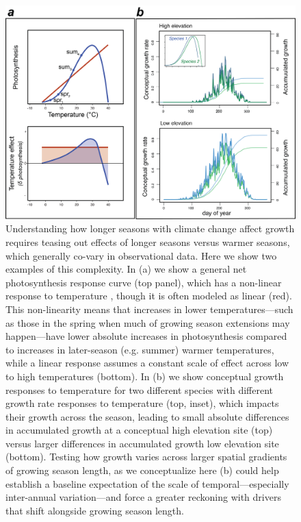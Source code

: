 \documentclass[11pt]{article}
\begin{document}
\clearpage
\begin{figure}[h!]
\includegraphics[width=1\textwidth]{..//figures/elevationconcept/elevationrateswtempresponse.png}
\caption{Understanding how longer seasons with climate change affect growth requires teasing out effects of longer seasons versus warmer seasons, which generally co-vary in observational data. Here we show two examples of this complexity. In (a) we show a general net photosynthesis response curve (top panel), which has a non-linear response to temperature  \citep[blue curve, adapted from meta-analysis of][]{rezende2019thermal}, though it is often modeled as linear (red). This non-linearity means that increases in lower temperatures---such as those in the spring when much of growing season extensions may happen---have lower absolute increases in photosynthesis compared to increases in later-season (e.g. summer) warmer temperatures, while a linear response assumes a constant scale of effect across low to high temperatures (bottom). In (b) we show conceptual growth responses to temperature for two different species with different growth rate responses to temperature (top, inset), which impacts their growth across the season, leading to small absolute differences in accumulated growth at a conceptual high elevation site (top) versus larger differences in accumulated growth low elevation site (bottom). Testing how growth varies across larger spatial gradients of growing season length, as we conceptualize here (b) could help establish a baseline expectation of the scale of temporal---especially inter-annual variation---and force a greater reckoning with drivers that shift alongside growing season length.}

\end{figure}
\end{document}
